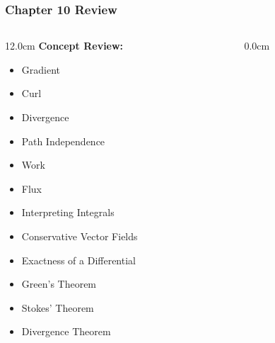 %
% 

\begin{frame}
\frametitle{\Large {\color[rgb]{0.02,0.20,1.0} Chapter 10 Review}}
\scriptsize
\begin{columns}
\begin{column}{12.0cm}
{\bf Concept Review:}

\vspace{0.2cm}

\begin{itemize}
	\item Gradient
	\item Curl
	\item Divergence
	\item Path Independence
	\item Work
	\item Flux
	\item Interpreting Integrals
	\item Conservative Vector Fields
	\item Exactness of a Differential
	\item Green's Theorem
	\item Stokes' Theorem
	\item Divergence Theorem
\end{itemize}

\vspace{0.2cm}

\end{column}
\begin{column}{0.0cm}\end{column}
\end{columns}
\end{frame}

